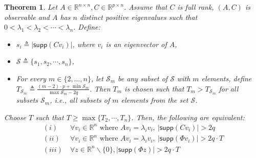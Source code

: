 \documentclass[twocolumn]{autart}    %
\newtheorem{Thm}{\bf{Theorem}}
\newcommand{\rev}[1]{{\normalsize{{{\color{blue}#1}}}}}
\begin{document}
\begin{Thm} Let $A \in \mathbb{R}^{n\times n}, C \in \mathbb{R}^{p\times n}$. Assume that $C$ is full rank, $(A,C)$ is observable and $A$ has $n$ distinct positive eigenvalues such that $0 < \lambda_1 < \lambda_2 < \cdots < \lambda_n$. 
Define:
\vspace{-0.4cm}
\begin{itemize}
\item
$s_i \triangleq \lvert \textsf{supp} (Cv_i) \vert$, where $v_i$ is an eigenvector of $A$, 
\item
$\mathcal{S} \triangleq \{ s_1, s_2, \cdots, s_n \}$,
\item
For every $m \in \{2, \ldots, n\}$, let $\mathcal{S}_m$ be any subset of $\mathcal{S}$ with $m$ elements, define $T_{\mathcal{S}_m} \triangleq \frac {  (m-2) \cdot p + \min \mathcal{S}_m } {\max \mathcal{S}_m - 2q }$.
\rev{Then $T_m$ is chosen such that $T_m > T_{\mathcal{S}_m}$ for all subsets $\mathcal{S}_m$}, i.e., all subsets of $m$ elements from the set $\mathcal{S}$.
\end{itemize}
\vspace{-0.2cm}
Choose $T$ such that  $T \ge \max \{ T_2, \cdots, T_n \}$.
Then, the following are equivalent:
\vspace{-0.2cm}
\begin{equation}
\begin{aligned} 
 (i)  &~\forall v_i \in \mathbb{R}^n \text{ where } Av_i =\lambda_i v_i, ~ \lvert \textsf{supp}(Cv_i) \rvert > 2q  \\
  (ii)  &~\forall v_i \in \mathbb{R}^n \text{ where } Av_i =\lambda_i v_i,  ~\lvert \textsf{supp} (\Phi v_i) \rvert > 2q \cdot T  \\
  (iii) &~  \forall z \in \mathbb{R}^n\backslash \{0 \}, \lvert \textsf{supp} (\Phi z) \rvert > 2 q \cdot T  \nonumber %
\label{eq:new_condition}
\end{aligned}
\end{equation}
\vspace{-0.4cm}
\end{Thm}
\end{document}

